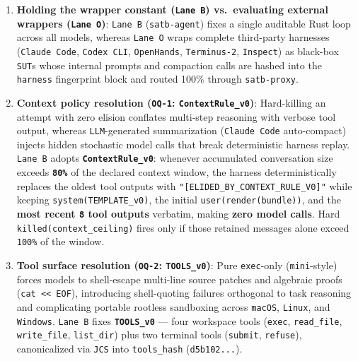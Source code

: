 \documentclass[10pt,letterpaper]{article}
\providecommand{\tightlist}{\setlength{\itemsep}{1pt}\setlength{\parskip}{0pt}}
\begin{document}
\begin{enumerate}
\def\labelenumi{\arabic{enumi}.}
\tightlist
\item
  \textbf{Holding the wrapper constant (\texttt{Lane\ B}) vs.~evaluating
  external wrappers (\texttt{Lane\ O})}: \texttt{Lane\ B}
  (\texttt{satb-\allowbreak{}agent}) fixes a single auditable Rust loop across all
  models, whereas \texttt{Lane\ O} wraps complete third-party harnesses
  (\texttt{Claude\ Code}, \texttt{Codex\ CLI}, \texttt{OpenHands},
  \texttt{Terminus-\allowbreak{}2}, \texttt{Inspect}) as black-box \texttt{SUT}s
  whose internal prompts and compaction calls are hashed into the
  \texttt{harness} fingerprint block and routed 100\% through
  \texttt{satb-\allowbreak{}proxy}.
\item
  \textbf{Context policy resolution (\texttt{OQ-1}:
  \texttt{ContextRule\_\allowbreak{}v0})}: Hard-killing an attempt with zero elision
  conflates multi-step reasoning with verbose tool output, whereas
  \texttt{LLM}-generated summarization (\texttt{Claude\ Code}
  auto-compact) injects hidden stochastic model calls that break
  deterministic harness replay. \texttt{Lane\ B} adopts
  \textbf{\texttt{ContextRule\_\allowbreak{}v0}}: whenever accumulated conversation
  size exceeds \textbf{\texttt{80\%}} of the declared context window,
  the harness deterministically replaces the oldest tool outputs with
  \texttt{"{[}ELIDED\_BY\_CONTEXT\_RULE\_V0{]}"} while keeping
  \texttt{system(\allowbreak{}TEMPLATE\_\allowbreak{}v0)}, the initial
  \texttt{user(\allowbreak{}render(\allowbreak{}bundle))}, and the \textbf{most recent \texttt{8}
  tool outputs} verbatim, making \textbf{zero model calls}. Hard
  \texttt{killed(\allowbreak{}context\_\allowbreak{}ceiling)} fires only if those retained
  messages alone exceed \texttt{100\%} of the window.
\item
  \textbf{Tool surface resolution (\texttt{OQ-2}: \texttt{TOOLS\_v0})}:
  Pure \texttt{exec}-only (\texttt{mini}-style) forces models to
  shell-escape multi-line source patches and algebraic proofs
  (\texttt{cat\ \textless{}\textless{}\ \textquotesingle{}EOF\textquotesingle{}}),
  introducing shell-quoting failures orthogonal to task reasoning and
  complicating portable rootless sandboxing across \texttt{macOS},
  \texttt{Linux}, and \texttt{Windows}. \texttt{Lane\ B} fixes
  \textbf{\texttt{TOOLS\_v0}} --- four workspace tools (\texttt{exec},
  \texttt{read\_\allowbreak{}file}, \texttt{write\_\allowbreak{}file}, \texttt{list\_dir}) plus
  two terminal tools (\texttt{submit}, \texttt{refuse}), canonicalized
  via \texttt{JCS} into \texttt{tools\_\allowbreak{}hash} (\texttt{d5b102...}).
\end{enumerate}
\end{document}
